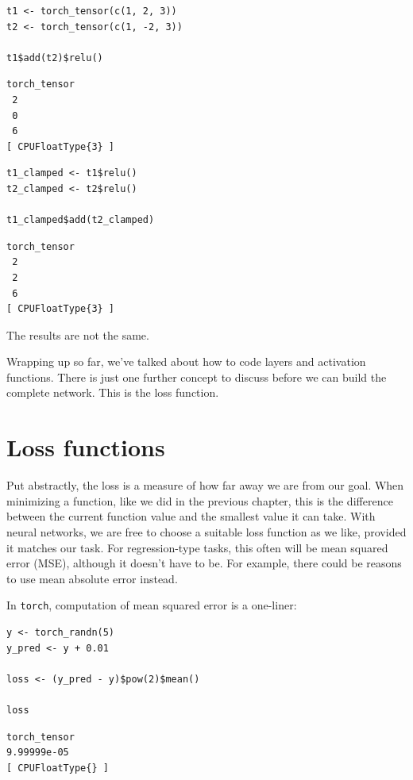\documentclass[
  letterpaper,
]{krantz}
\begin{document}
\begin{verbatim}
t1 <- torch_tensor(c(1, 2, 3))
t2 <- torch_tensor(c(1, -2, 3))

t1$add(t2)$relu()
\end{verbatim}

\begin{verbatim}
torch_tensor
 2
 0
 6
[ CPUFloatType{3} ]
\end{verbatim}

\begin{verbatim}
t1_clamped <- t1$relu()
t2_clamped <- t2$relu()

t1_clamped$add(t2_clamped)
\end{verbatim}

\begin{verbatim}
torch_tensor
 2
 2
 6
[ CPUFloatType{3} ]
\end{verbatim}

The results are not the same.

Wrapping up so far, we've talked about how to code layers and activation
functions. There is just one further concept to discuss before we can
build the complete network. This is the loss function.

\hypertarget{loss-functions}{%
\section{Loss functions}\label{loss-functions}}

Put abstractly, the loss is a measure of how far away we are from our
goal. When minimizing a function, like we did in the previous chapter,
this is the difference between the current function value and the
smallest value it can take. With neural networks, we are free to choose
a suitable loss function as we like, provided it matches our task. For
regression-type tasks, this often will be mean squared error (MSE),
although it doesn't have to be. For example, there could be reasons to
use mean absolute error instead.

In \texttt{torch}, computation of mean squared error is a one-liner:

\begin{verbatim}
y <- torch_randn(5)
y_pred <- y + 0.01

loss <- (y_pred - y)$pow(2)$mean()

loss
\end{verbatim}

\begin{verbatim}
torch_tensor
9.99999e-05
[ CPUFloatType{} ]
\end{verbatim}
\end{document}
